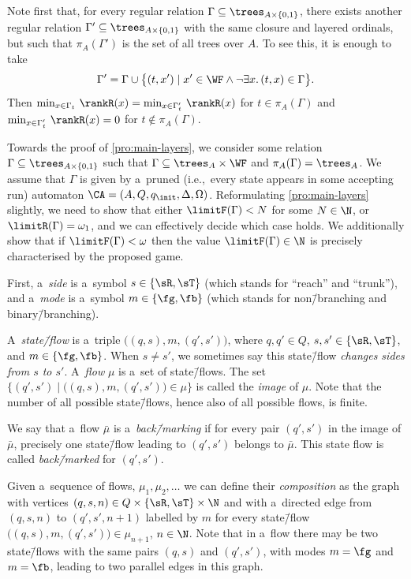 Note first that, for every regular relation $\Gamma\subseteq\trees_{A\times\{0,1\}}$, there exists another regular relation $\Gamma'\subseteq\trees_{A\times\{0,1\}}$ with the same closure and layered ordinals,
but such that $\pi_A(\Gamma')$ is the set of all trees over $A$.
To see this, it is enough to take
\[\Gamma'=\Gamma\cup\big\{(t,x')\mid x'\in\WF\land\neg\exists x.\,(t,x)\in\Gamma\big\}.\]
Then $\min_{x\in \Gamma_t}\,\rankR(x)=\min_{x\in \Gamma'_t}\,\rankR(x)$ for $t\in\pi_A(\Gamma)$ and $\min_{x\in \Gamma'_t}\,\rankR(x)=0$ for $t\not\in\pi_A(\Gamma)$.

Towards the proof of \cref{pro:main-layers}, we consider some relation $\Gamma\subseteq\trees_{A\times\{0,1\}}$ such that $\Gamma\subseteq\trees_A\times\WF$ and $\pi_A(\Gamma)=\trees_A$.
We assume that $\Gamma$ is given by a~pruned (i.e.,~every state appears in some accepting run) automaton $\CA=(A,Q, q_{\init}, \Delta,\Omega)$.
Reformulating \cref{pro:main-layers} slightly, we need to show that either $\limitF(\Gamma)< N$ for some $N\in\N$, or $\limitR(\Gamma)=\omega_1$, and we can effectively decide which case holds.
We additionally show that if $\limitF(\Gamma)<\omega$ then the value $\limitF(\Gamma)\in \N$ is precisely characterised by the proposed game.

First, a~\emph{side} is a~symbol $s\in\{\sR,\sT\}$ (which stands for ``reach'' and ``trunk''),
and a~\emph{mode} is a~symbol $m\in\{\fg,\fb\}$ (which stands for non\=/branching and binary\=/branching).

A~\emph{state\=/flow} is a~triple $\big((q,s), m, (q',s')\big)$, where $q,q'\in Q$, $s,s'\in\{\sR,\sT\}$, and $m\in\{\fg,\fb\}$.
When $s\neq s'$, we sometimes say this state\=/flow \emph{changes sides from $s$ to $s'$}.
A~\emph{flow} $\mu$ is a~set of state\=/flows.
The set $\big\{(q',s')\mid\big((q,s),m,(q',s')\big)\in\mu\big\}$ is called the \emph{image} of $\mu$.
Note that the number of all possible state\=/flows, hence also of all possible flows, is finite.

We say that a~flow $\bar\mu$ is a~\emph{back\=/marking} if for every pair $(q',s')$ in the image of $\bar\mu$, precisely one state\=/flow leading to $(q',s')$ belongs to $\bar{\mu}$.
This state flow is called \emph{back\=/marked} for $(q',s')$.

Given a~sequence of flows, $\mu_1,\mu_2,\dots$ we can define their \emph{composition} as the graph with vertices $(q,s,n)\in Q\times\{\sR,\sT\}\times\N$
and with a~directed edge from $(q,s,n)$ to $(q',s',n{+}1)$ labelled by $m$ for every state\=/flow $\big((q,s),m,(q',s')\big)\in\mu_{n+1}$, $n\in\N$.
Note that in a~flow there may be two state\=/flows with the same pairs $(q,s)$ and $(q',s')$, with modes $m=\fg$ and $m=\fb$, leading to two parallel edges in this graph.

